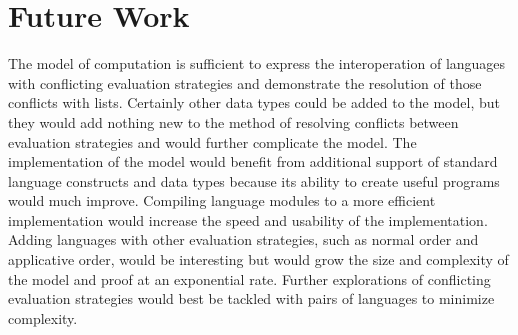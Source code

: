 \chapter{Future Work}

The model of computation is sufficient to express the interoperation of languages with conflicting evaluation strategies and demonstrate the resolution of those conflicts with lists.  Certainly other data types could be added to the model, but they would add nothing new to the method of resolving conflicts between evaluation strategies and would further complicate the model.  The implementation of the model would benefit from additional support of standard language constructs and data types because its ability to create useful programs would much improve.  Compiling language modules to a more efficient implementation would increase the speed and usability of the implementation.  Adding languages with other evaluation strategies, such as normal order and applicative order, would be interesting but would grow the size and complexity of the model and proof at an exponential rate.  Further explorations of conflicting evaluation strategies would best be tackled with pairs of languages to minimize complexity.